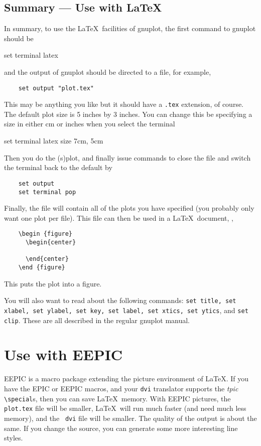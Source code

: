 \subsection{Summary --- Use with \LaTeX}
In summary, to use the \LaTeX\ facilities of gnuplot, the first
command to gnuplot should be
\begin{syntax}
    set terminal latex
\end{syntax}
and the output of gnuplot should be directed to a file, for example,
\begin{verbatim}
    set output "plot.tex"
\end{verbatim}
This may be anything you like but it should have a {\tt .tex} extension,
of course. The default plot size is 5 inches by 3 inches.
You can change this be specifying a size in either cm or inches when 
you select the terminal
\begin{syntax}
    set terminal latex size 7cm, 5cm
\end{syntax}


Then you do the (s)plot, and finally issue commands to close the file and
switch the terminal back to the default by
\begin{verbatim}
    set output
    set terminal pop
\end{verbatim}

Finally, the file will contain all of the plots you have
specified (you probably only want one plot per file). This file can
then be used in a \LaTeX\ document, \eg,

\singlespace
\begin{verbatim}
    \begin {figure}
      \begin{center}
        
      \end{center}
    \end {figure}
\end{verbatim}
\currentspace
This puts the plot into a figure.

You will also want to read about the following commands: {\tt set
title, set xlabel, set ylabel, set key, set label, set xtics, set
ytics}, and {\tt set clip}.  These are all described in the regular
gnuplot manual.

\section{Use with EEPIC}
\label{s:eepic}
EEPIC is a macro package extending the picture environment of \LaTeX.
If you have the EPIC or EEPIC macros, and your {\tt dvi} translator
supports the {\em tpic\/} \verb+\special+s, then you can save \LaTeX\
memory.  With EEPIC pictures, the {\tt plot.tex} file will be smaller,
\LaTeX\ will run much faster (and need much less memory), and the {\tt
dvi} file will be smaller. The quality of the output is about the
same. If you change the source, you can generate some more interesting
line styles.

